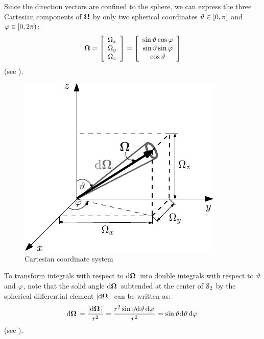 Since the direction vectors are confined to the sphere, we can express the three
Cartesian components of $\mathbf{\Omega}$ by only two spherical coordinates $\vartheta\in[0,\pi]$ and
$\varphi\in[0,2\pi)$:
\begin{equation*}
	\mathbf{\Omega} = \left[\begin{array}{c}
		\Omega_x \\
		\Omega_y \\
		\Omega_z
	\end{array}\right] = \left[\begin{array}{c}
		\sin \vartheta\cos \varphi \\
		\sin \vartheta\sin \varphi \\
		\cos \vartheta
	\end{array}\right]
\end{equation*}
(see ).
\begin{figure}[!hbt]
    \centering
    \includegraphics[scale=1.125]{cartesian_streaming}
    \caption[Cartesian coordinate system]{Cartesian coordinate system}
    \label{fig:streaming}
\end{figure}
To transform integrals with respect to $\text{d}\mathbf{\Omega}\,$ into double integrals with respect to $\vartheta$ and $\varphi$,
note that the solid angle $\text{d}\mathbf{\Omega}\,$ subtended at the center of $\mathcal{S}_2$ by the spherical differential element
$\left\vert \text{d}\mathbf{\Omega}\, \right\vert$ can be written as:
$$
	\text{d}\mathbf{\Omega}\, = \frac{\left\vert \text{d}\mathbf{\Omega}\, \right\vert}{r^2} = \frac{r^2 \sin \vartheta \text{d}\vartheta\,\text{d}\varphi\,}{r^2} =  \sin \vartheta
	\text{d}\vartheta\,\text{d}\varphi\, $$
(see ).
